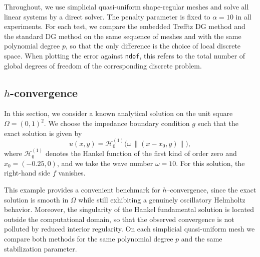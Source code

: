 \documentclass[11pt]{article}
\theoremstyle{definition}
\theoremstyle{plain}
\newcommand{\calH}{\mathcal{H}}
\begin{document}
Throughout, we use simplicial quasi-uniform shape-regular meshes and solve all linear systems by a direct solver.
The penalty parameter is fixed to $\alpha=10$ in all experiments.
For each test, we compare the embedded Trefftz DG method and the standard DG method on the same sequence of meshes and with the same polynomial degree $p$, so that the only difference is the choice of local discrete space.
When plotting the error against \texttt{ndof}, this refers to the total number of global degrees of freedom of the corresponding discrete problem.

\subsection{\texorpdfstring{$h$}{h}-convergence}\label{sec:hconvergence}

In this section, we consider a known analytical solution on the unit square $\Omega = (0,1)^2$. 
We choose the impedance boundary condition $g$ such that the exact solution is given by
\begin{equation}\label{eq:hankel}
u(x,y) = \calH_0^{(1)}\bigl(\omega \,\| (x - x_0, y) \|\bigr),
\end{equation}
where $\calH_0^{(1)}$ denotes the Hankel function of the first kind of order zero and $x_0 = (-0.25,0)$, and we take the wave number $\omega = 10$.
For this solution, the right-hand side $f$ vanishes.

This example provides a convenient benchmark for $h$--convergence, since the exact solution is smooth in $\Omega$ while still exhibiting a genuinely oscillatory Helmholtz behavior.
Moreover, the singularity of the Hankel fundamental solution is located outside the computational domain, so that the observed convergence is not polluted by reduced interior regularity.
On each simplicial quasi-uniform mesh we compare both methods for the same polynomial degree $p$ and the same stabilization parameter.
\end{document}
